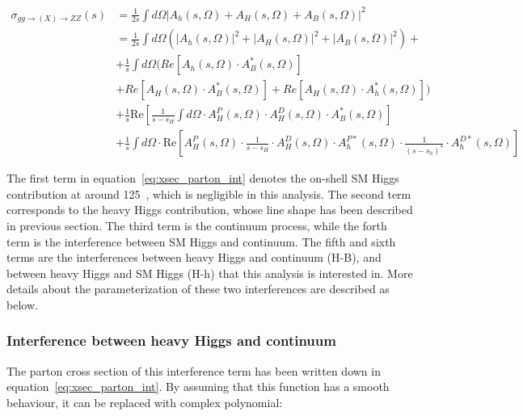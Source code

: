 \begingroup
\small
\begin{equation} \label{eq:xsec_parton_int}
\begin{split}
    \sigma_{gg \to (X) \to ZZ} (s) &= \frac{1}{2s}  \int d \Omega \left | A_h(s,\Omega) + A_H(s,\Omega) + A_B(s,\Omega) \right |^2 \\
    &= \frac{1}{2s}  \int d \Omega  \left (  \left | A_h(s,\Omega)  \right |^2 +  \left | A_H(s,\Omega)  \right |^2 +  \left | A_B(s,\Omega)  \right |^2  \right )  + \\
    &+ \frac{1}{s}  \int d \Omega  \big( Re \left [ A_h(s,\Omega) \cdot A^*_B(s,\Omega)  \right ] \\
    &+ Re \left [ A_H(s,\Omega) \cdot A^*_B(s,\Omega)  \right ] + Re \left [ A_H(s,\Omega) \cdot A^*_h(s,\Omega)  \right ]  \big) \\
    &+ \frac{1}{s} \mathrm{Re} \left [ \frac{1}{s-s_H}  \int d \Omega \cdot A_H^P(s,\Omega)  \cdot A_H^D(s,\Omega) \cdot A^*_B(s,\Omega)  \right ] \\
    &+ \frac{1}{s} \int d \Omega \cdot \mathrm{Re} \left [A_H^P(s,\Omega)\cdot  \frac{1}{s-s_H}   \cdot A_H^D(s,\Omega) \cdot A_h^{P*}(s,\Omega)\cdot  \frac{1}{(s-s_h)^*}   \cdot A_h^{D*}(s,\Omega)   \right ]
\end{split}
\end{equation}
\endgroup

The first term in equation~\ref{eq:xsec_parton_int} denotes the on-shell SM Higgs contribution at around 125~\gev, which is negligible in this analysis.
The second term corresponds to the heavy Higgs contribution, whose line shape has been described in previous section.
The third term is the \ggZZ continuum process, while the forth term is the interference between SM Higgs and \ggZZ continuum.
The fifth and sixth terms are the interferences between heavy Higgs and \ggZZ continuum (H-B), and between heavy Higgs and SM Higgs (H-h) that this analysis is interested in.
More details about the parameterization of these two interferences are described as below.

\subsubsection{Interference between heavy Higgs and \ggZZ continuum}

The parton cross section of this interference term has been written down in equation~\ref{eq:xsec_parton_int}.
By assuming that this function has a smooth behaviour, it can be replaced with complex polynomial:

